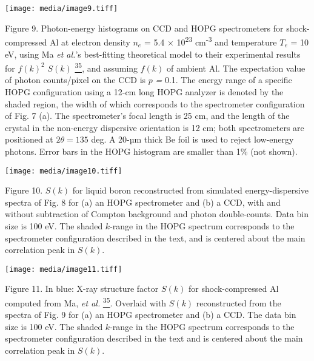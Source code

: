 \texttt{[image: media/image9.tiff]}

Figure 9. Photon-energy histograms on
CCD and HOPG spectrometers for shock-compressed Al at electron density
\(n_{e}\) = 5.4 × 10\textsuperscript{23} cm\textsuperscript{-3} and
temperature \(T_{e}\) = 10 eV, using Ma \emph{et al.}'s best-fitting
theoretical model to their experimental results for \({f(k)}^{2}\)
\(S(k)\)
\hyperref[t.-ma-et-al.-physical-review-letters-110-065001-2013.]{\textsuperscript{35}},
and assuming \(f(k)\) of ambient Al. The expectation value of photon
counts/pixel on the CCD is \(p\) \emph{=} 0.1. The energy range of a
specific HOPG configuration using a 12-cm long HOPG analyzer is denoted
by the shaded region, the width of which corresponds to the spectrometer
configuration of Fig. 7 (a). The spectrometer's focal length is 25 cm,
and the length of the crystal in the non-energy dispersive orientation
is 12 cm; both spectrometers are positioned at \(2\theta = 135\) deg. A
20-µm thick Be foil is used to reject low-energy photons. Error bars in
the HOPG histogram are smaller than 1\% (not shown).

\texttt{[image: media/image10.tiff]}

Figure 10. \(S(k)\) for liquid boron
reconstructed from simulated energy-dispersive spectra of Fig. 8 for (a)
an HOPG spectrometer and (b) a CCD, with and without subtraction of
Compton background and photon double-counts. Data bin size is 100 eV.
The shaded \(k\)-range in the HOPG spectrum corresponds to the
spectrometer configuration described in the text, and is centered about
the main correlation peak in \(S(k)\).

\texttt{[image: media/image11.tiff]}


Figure 11. In blue: X-ray structure factor \(S(k)\) for shock-compressed
Al computed from Ma, \emph{et al.}
\hyperref[t.-ma-et-al.-physical-review-letters-110-065001-2013.]{\textsuperscript{35}}.
Overlaid with \(S(k)\) reconstructed from the spectra of Fig. 9 for (a)
an HOPG spectrometer and (b) a CCD. The data bin size is 100 eV. The
shaded \(k\)-range in the HOPG spectrum corresponds to the spectrometer
configuration described in the text and is centered about the main
correlation peak in \(S(k)\).

\subsection{}\label{section-5}

